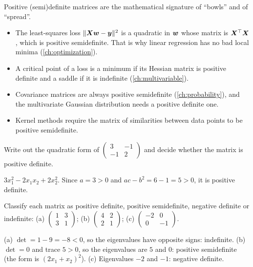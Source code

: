 \begin{mlnote}
Positive (semi)definite matrices are the mathematical signature of ``bowls''
and of ``spread''.
\begin{itemize}
  \item The least-squares loss $\lVert\bm{X}\bm{w} - \bm{y}\rVert^2$ is a quadratic in $\bm{w}$
    whose matrix is $\bm{X}^\top\bm{X}$, which is positive semidefinite. That is why
    linear regression has no bad local minima (\cref{ch:optimization}).
  \item A critical point of a loss is a minimum if its Hessian matrix is
    positive definite and a saddle if it is indefinite
    (\cref{ch:multivariable}).
  \item Covariance matrices are always positive semidefinite
    (\cref{ch:probability}), and the multivariate Gaussian distribution needs a
    positive definite one.
  \item Kernel methods require the matrix of similarities between data points
    to be positive semidefinite.
\end{itemize}
\end{mlnote}

\sectionexercises

\begin{exercise}
Write out the quadratic form of
$\left(\begin{smallmatrix} 3 & -1\\ -1 & 2\end{smallmatrix}\right)$ and decide
whether the matrix is positive definite.
\end{exercise}
\begin{solution}
$3x_1^2 - 2x_1x_2 + 2x_2^2$. Since $a = 3 > 0$ and $ac - b^2 = 6 - 1 = 5 > 0$,
it is positive definite.
\end{solution}

\begin{exercise}
Classify each matrix as positive definite, positive semidefinite, negative
definite or indefinite: (a) $\left(\begin{smallmatrix} 1 & 3\\ 3 &
1\end{smallmatrix}\right)$; (b) $\left(\begin{smallmatrix} 4 & 2\\ 2 &
1\end{smallmatrix}\right)$; (c) $\left(\begin{smallmatrix} -2 & 0\\ 0 &
-1\end{smallmatrix}\right)$.
\end{exercise}
\begin{solution}
(a) $\det = 1 - 9 = -8 < 0$, so the eigenvalues have opposite signs:
indefinite. (b) $\det = 0$ and trace $5 > 0$, so the eigenvalues are $5$ and
$0$: positive semidefinite (the form is $(2x_1 + x_2)^2$). (c) Eigenvalues $-2$
and $-1$: negative definite.
\end{solution}

